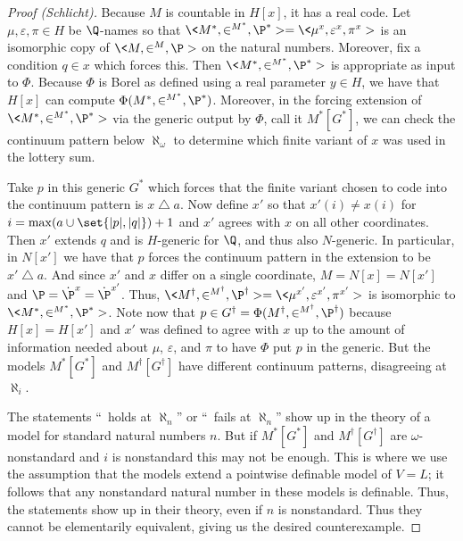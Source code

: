 \documentclass{amsart}
\begin{document}
\begin{proof}[Proof (Schlicht)]
Because $M$ is countable in $H[x]$, it has a real code. Let $\mu,\varepsilon,\pi \in H$ be $\Q$-names so that $\<M^*, \in^{M^*}, \P^*> = \<\mu^x,\varepsilon^x,\pi^x>$ is an isomorphic copy of $\<M,\in^M,\P>$ on the natural numbers. Moreover, fix a condition $q \in x$ which forces this. Then \hbox{$\<M^*, \in^{M^*}, \P^*>$} is appropriate as input to $\Phi$. Because $\Phi$ is Borel as defined using a real parameter $y \in H$, we have that $H[x]$ can compute $\Phi(M^*, \in^{M^*}, \P^*)$. Moreover, in the forcing extension of $\<M^*, \in^{M^*}, \P^*>$ via the generic output by $\Phi$, call it $M^*[G^*]$, we can check the continuum pattern below $\aleph_\omega$ to determine which finite variant of $x$ was used in the lottery sum.

Take $p$ in this generic $G^*$ which forces that the finite variant chosen to code into the continuum pattern is $x \mathbin{\triangle} a$.  Now define $x'$ so that $x'(i) \ne x(i)$ for $i = \max(a \cup \set{\lvert p \rvert, \lvert q \rvert})+1$ and $x'$ agrees with $x$ on all other coordinates. Then $x'$ extends $q$ and is $H$-generic for $\Q$, and thus also $N$-generic. In particular, in $N[x']$ we have that $p$ forces the continuum pattern in the extension to be $x' \mathbin{\triangle} a$.
And since $x'$ and $x$ differ on a single coordinate, $M = N[x] = N[x']$ and $\P = \dot \P^x = \dot \P^{x'}$. Thus, $\<M^\dagger,\in^{M^\dagger}, \P^\dagger> = \<\mu^{x'}, \varepsilon^{x'}, \pi^{x'}>$ is isomorphic to $\<M^*,\in^{M^*},\P^*>$. Note now that $p \in G^\dagger = \Phi(M^\dagger,\in^{M^\dagger}, \P^\dagger)$ because $H[x] = H[x']$ and $x'$ was defined to agree with $x$ up to the amount of information needed about $\mu$, $\varepsilon$, and $\pi$ to have $\Phi$ put $p$ in the generic. But the models $M^*[G^*]$ and $M^\dagger[G^\dagger]$ have different continuum patterns, disagreeing at $\aleph_i$.

The statements ``\GCH\ holds at $\aleph_n$'' or ``\GCH\ fails at $\aleph_n$'' show up in the theory of a model for standard natural numbers $n$. But if $M^*[G^*]$ and $M^\dagger[G^\dagger]$ are $\omega$-nonstandard and $i$ is nonstandard this may not be enough. This is where we use the assumption that the models extend a pointwise definable model of $V=L$; it follows that any nonstandard natural number in these models is definable. Thus, the statements show up in their theory, even if $n$ is nonstandard. Thus they cannot be elementarily equivalent, giving us the desired counterexample.
\end{proof}
\end{document}

